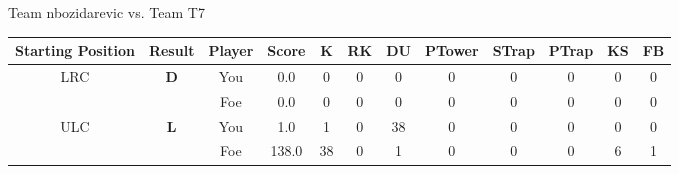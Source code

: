 \documentclass[a4paper,12pt]{article}
\begin{document}
  \vspace*{2em}
  \par {\large {\color{Gray} Team} nbozidarevic {\color{Gray}
      vs. Team} T7}
  \newline
  \begin{tabular}[t]{| c | c | c | c | c | c | c | c | c | c | c | c
      |}
    \hline
    Starting Position & \textbf{Result} & Player & \textbf{Score} & K & RK & DU & PTower & STrap & PTrap & KS & FB \\
    
      
                      
      
        \hline
        \multirow{2}{*}{  LRC
             } &
              \multirow{2}{*}{  
                  \textbf{D}  } & 
                    \cellcolor{yellow!25} You & \cellcolor{yellow!25} 0.0 & \cellcolor{yellow!25} 0 &
                    \cellcolor{yellow!25} 0 & \cellcolor{yellow!25} 0 & \cellcolor{yellow!25} 0 &
                    \cellcolor{yellow!25} 0 & \cellcolor{yellow!25} 0 & \cellcolor{yellow!25} 0 &
                    \cellcolor{yellow!25} 0 \\
                    \cline{3-12}
                    & & \cellcolor{red!15} Foe & \cellcolor{red!15} 0.0 & \cellcolor{red!15} 0 & \cellcolor{red!15}
                    0 & \cellcolor{red!15} 0
                    & \cellcolor{red!15} 0 & \cellcolor{red!15}
                    0 & \cellcolor{red!15} 0 
                    & \cellcolor{red!15} 0 & \cellcolor{red!15}
                    0 \\
                    
                      
      
                      
      
                      
      
                      
      
                      
      
                      
      
        \hline
        \multirow{2}{*}{  ULC  } &
              \multirow{2}{*}{  \textbf{L}  } & 
                    \cellcolor{yellow!25} You & \cellcolor{yellow!25} 1.0 & \cellcolor{yellow!25} 1 &
                    \cellcolor{yellow!25} 0 & \cellcolor{yellow!25} 38 & \cellcolor{yellow!25} 0 &
                    \cellcolor{yellow!25} 0 & \cellcolor{yellow!25} 0 & \cellcolor{yellow!25} 0 &
                    \cellcolor{yellow!25} 0 \\
                    \cline{3-12}
                    & & \cellcolor{red!15} Foe & \cellcolor{red!15} 138.0 & \cellcolor{red!15} 38 & \cellcolor{red!15}
                    0 & \cellcolor{red!15} 1
                    & \cellcolor{red!15} 0 & \cellcolor{red!15}
                    0 & \cellcolor{red!15} 0 
                    & \cellcolor{red!15} 6 & \cellcolor{red!15}
                    1 \\
                    

\end{tabular}
\end{document}
